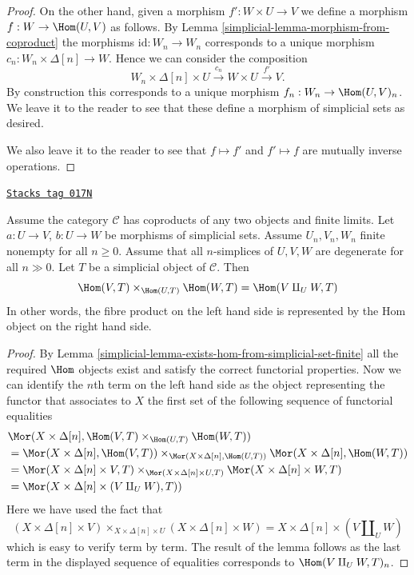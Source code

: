 \begin{proof}
\medskip\noindent
On the other hand, given a morphism
$f' : W \times U \to V$ we define
a morphism $f : W \to \Hom(U, V)$
as follows. By Lemma \ref{simplicial-lemma-morphism-from-coproduct} the morphisms
$\text{id} : W_n \to W_n$ corresponds to a unique
morphism $c_n : W_n \times \Delta[n] \to W$.
Hence we can consider the composition
$$
W_n \times \Delta[n] \times U
\xrightarrow{c_n}
W \times U
\xrightarrow{f'}
V.
$$
By construction this corresponds to a unique morphism
$f_n : W_n \to \Hom(U, V)_n$. We leave it to the reader
to see that these define a morphism of simplicial sets as
desired.

\medskip\noindent
We also leave it to the reader to see that
$f \mapsto f'$ and $f' \mapsto f$ are mutually inverse
operations.
\end{proof}

\begin{lemma}
\label{simplicial-lemma-hom-from-coprod}
\href{https://stacks.math.columbia.edu/tag/017N}{\texttt{Stacks tag 017N}}

Assume the category $\mathcal{C}$
has coproducts of any two objects and finite
limits. Let $a : U \to V$, $b : U \to W$
be morphisms of simplicial sets.
Assume $U_n, V_n, W_n$ finite nonempty for all $n \geq 0$.
Assume that all $n$-simplices of $U, V, W$
are degenerate for all $n \gg 0$.
Let $T$ be a simplicial object of $\mathcal{C}$.
Then
$$
\Hom(V, T) \times_{\Hom(U, T)} \Hom(W, T)
=
\Hom(V \amalg_U W, T)
$$
In other words, the fibre product on the left hand
side is represented by the Hom object on the right hand side.
\end{lemma}

\begin{proof}

By Lemma \ref{simplicial-lemma-exists-hom-from-simplicial-set-finite}
all the required $\Hom$ objects exist and satisfy the
correct functorial properties. Now we can identify
the $n$th term on the left hand side as the object
representing the functor that associates to $X$
the first set of the following sequence of functorial
equalities
\begin{align*}
&
\Mor(X \times \Delta[n],
\Hom(V, T) \times_{\Hom(U, T)} \Hom(W, T)) \\
& =
\Mor(X \times \Delta[n], \Hom(V, T))
\times_{\Mor(X \times \Delta[n], \Hom(U, T))}
\Mor(X \times \Delta[n], \Hom(W, T)) \\
& =
\Mor(X \times \Delta[n] \times V, T)
\times_{\Mor(X \times \Delta[n] \times U, T)}
\Mor(X \times \Delta[n] \times W, T) \\
& =
\Mor(X \times \Delta[n] \times (V \amalg_U W), T))
\end{align*}
Here we have used the fact that
$$
(X \times \Delta[n] \times V)
\times_{X \times \Delta[n] \times U}
(X \times \Delta[n] \times W)
=
X \times \Delta[n] \times (V \amalg_U W)
$$
which is easy to verify term by term. The result of the lemma
follows as the last term in the displayed sequence of
equalities corresponds to $\Hom(V \amalg_U W, T)_n$.
\end{proof}

